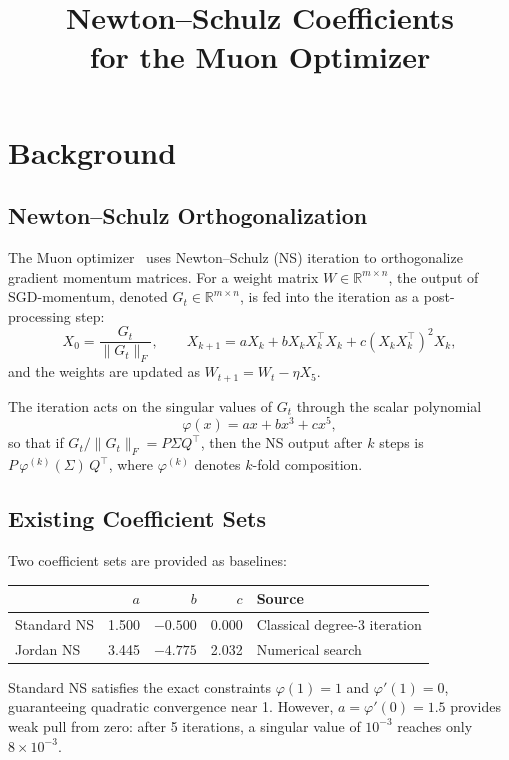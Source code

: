 \documentclass[11pt,a4paper]{article}
\title{\bfseries Newton--Schulz Coefficients\\
for the Muon Optimizer}
\author{}
\date{}
\newcommand{\R}{\mathbb{R}}
\newcommand{\poly}{\varphi}
\begin{document}
\maketitle

\section{Background}

\subsection{Newton--Schulz Orthogonalization}

The Muon optimizer~\cite{jordan2024} uses Newton--Schulz (NS) iteration to
orthogonalize gradient momentum matrices.  For a weight matrix
$W \in \R^{m \times n}$, the output of SGD-momentum, denoted
$G_t \in \R^{m \times n}$, is fed into the iteration as a post-processing
step:
\[
X_0 = \frac{G_t}{\|G_t\|_F}, \qquad
X_{k+1} = a X_k + b X_k X_k^\top X_k + c (X_k X_k^\top)^2 X_k,
\]
and the weights are updated as $W_{t+1} = W_t - \eta X_5$.

The iteration acts on the singular values of $G_t$ through the scalar
polynomial
\begin{equation}\label{eq:poly}
\poly(x) = a x + b x^3 + c x^5,
\end{equation}
so that if $G_t / \|G_t\|_F = P \Sigma Q^\top$, then the NS output after
$k$ steps is $P \, \poly^{(k)}(\Sigma) \, Q^\top$, where
$\poly^{(k)}$ denotes $k$-fold composition.

\subsection{Existing Coefficient Sets}

Two coefficient sets are provided as baselines:

\begin{center}
\begin{tabular}{lrrrl}
\toprule
& $a$ & $b$ & $c$ & Source \\
\midrule
Standard NS & 1.500 & $-0.500$ & 0.000 & Classical degree-3 iteration \\
Jordan NS   & 3.445 & $-4.775$ & 2.032 & Numerical search~\cite{jordan2024} \\
\bottomrule
\end{tabular}
\end{center}

Standard NS satisfies the exact constraints $\poly(1)=1$ and
$\poly'(1)=0$, guaranteeing quadratic convergence near 1.  However,
$a = \poly'(0) = 1.5$ provides weak pull from zero: after 5 iterations,
a singular value of $10^{-3}$ reaches only $8 \times 10^{-3}$.
\end{document}
